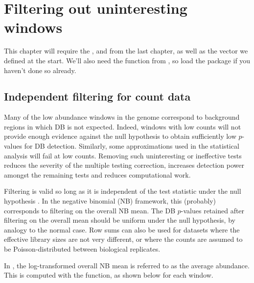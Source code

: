 \documentclass{report}\usepackage[]{graphicx}\usepackage[usenames,dvipsnames]{color}
\newenvironment{combox}
{ \definecolor{shadecolor}{RGB}{255, 240, 240} \begin{shaded}\begin{center}\begin{minipage}[t]{0.95\textwidth} }
{ \end{minipage}\end{center}\end{shaded} \definecolor{shadecolor}{RGB}{240,240,240} }
\begin{document}

\chapter{Filtering out uninteresting windows}
\label{chap:filter}

\begin{combox}
This chapter will require the ,  and  from the last chapter, as well as the  vector we defined at the start.
We'll also need the  function from , so load the package if you haven't done so already.
\end{combox}

\section{Independent filtering for count data}
Many of the low abundance windows in the genome correspond to background regions in which DB is not expected. 
Indeed, windows with low counts will not provide enough evidence against the null hypothesis to obtain sufficiently low $p$-values for DB detection. 
Similarly, some approximations used in the statistical analysis will fail at low counts. 
Removing such uninteresting or ineffective tests reduces the severity of the multiple testing correction, increases detection power amongst the remaining tests and reduces computational work.

Filtering is valid so long as it is independent of the test statistic under the null hypothesis \cite{bourgon2010}. 
In the negative binomial (NB) framework, this (probably) corresponds to filtering on the overall NB mean. 
The DB $p$-values retained after filtering on the overall mean should be uniform under the null hypothesis, by analogy to the normal case. 
Row sums can also be used for datasets where the effective library sizes are not very different, or where the counts are assumed to be Poisson-distributed between biological replicates. 

In , the log-transformed overall NB mean is referred to as the average abundance.
This is computed with the  function, as shown below for each window.
\end{document}
